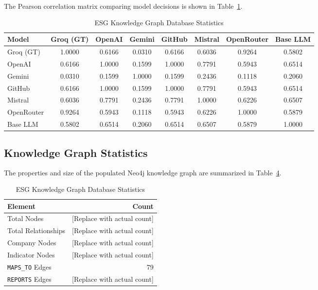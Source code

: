 \documentclass[journal,compsoc]{IEEEtran}
\begin{document}
\begin{table}[t]
The Pearson correlation matrix comparing model decisions is shown in Table~\ref{tab:pearson}.

\begin{table}[t]
\centering
\caption{Pearson Correlation Matrix of Model Decisions (Agree=1, Disagree=0)}
\label{tab:pearson}
\begin{tabular}{lccccccc}
\toprule
\textbf{Model} & \textbf{Groq (GT)} & \textbf{OpenAI} & \textbf{Gemini} & \textbf{GitHub} & \textbf{Mistral} & \textbf{OpenRouter} & \textbf{Base LLM} \\
\midrule
Groq (GT) & 1.0000 & 0.6166 & 0.0310 & 0.6166 & 0.6036 & 0.9264 & 0.5802 \\
OpenAI & 0.6166 & 1.0000 & 0.1599 & 1.0000 & 0.7791 & 0.5943 & 0.6514 \\
Gemini & 0.0310 & 0.1599 & 1.0000 & 0.1599 & 0.2436 & 0.1118 & 0.2060 \\
GitHub & 0.6166 & 1.0000 & 0.1599 & 1.0000 & 0.7791 & 0.5943 & 0.6514 \\
Mistral & 0.6036 & 0.7791 & 0.2436 & 0.7791 & 1.0000 & 0.6226 & 0.6507 \\
OpenRouter & 0.9264 & 0.5943 & 0.1118 & 0.5943 & 0.6226 & 1.0000 & 0.5879 \\
Base LLM & 0.5802 & 0.6514 & 0.2060 & 0.6514 & 0.6507 & 0.5879 & 1.0000 \\
\bottomrule
\end{tabular}
\end{table}

\subsection{Knowledge Graph Statistics}
The properties and size of the populated Neo4j knowledge graph are summarized in Table~\ref{tab:kg_stats}.

\begin{table}[h]
\centering
\caption{ESG Knowledge Graph Database Statistics}
\label{tab:kg_stats}
\begin{tabular}{lr}
\toprule
\textbf{Element} & \textbf{Count} \\
\midrule
Total Nodes & [Replace with actual count] \\
Total Relationships & [Replace with actual count] \\
Company Nodes & [Replace with actual count] \\
Indicator Nodes & [Replace with actual count] \\
\texttt{MAPS\_TO} Edges & 79 \\
\texttt{REPORTS} Edges & [Replace with actual count] \\
\bottomrule
\end{tabular}
\end{table}


\end{table}
\end{document}
